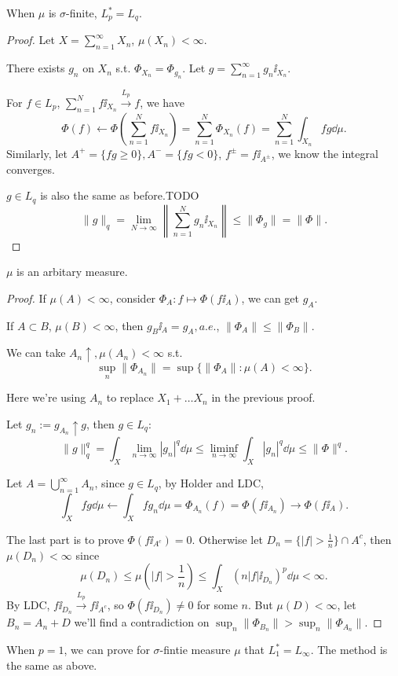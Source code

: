 \begin{proposition}
	When $\mu$ is $\sigma$-finite,  $L_p^* = L_q$.
\end{proposition}
\begin{proof}[Proof]
    Let $X = \sum_{n=1}^{\infty} X_n$, $\mu(X_n) < \infty$.

	There exists $g_n$ on $X_n$ s.t. $\Phi_{X_n} = \Phi_{g_n}$.
	Let $g = \sum_{n=1}^{\infty} g_n\ii_{X_n}$.

	For $f\in L_p$, $\sum_{n=1}^{N} f\ii_{X_n}\xrightarrow{L_p} f$, we have
	\[
	\Phi(f) \leftarrow \Phi\left(\sum_{n=1}^{N} f\ii_{X_n}\right)
	= \sum_{n=1}^{N} \Phi_{X_n}(f) = \sum_{n=1}^{N} \int_{X_n}fg\dd\mu.
	\]
	Similarly, let $A^+ = \{fg \ge 0\}, A^- = \{fg < 0\}$,
	$f^\pm = f\ii_{A^\pm}$, we know the integral converges.

	 $g\in L_q$ is also the same as before.TODO
	 \[
	 \lVert g \rVert _q =
	 \lim_{N\to \infty} \left\lVert \sum_{n=1}^{N} g_n\ii_{X_n} \right\rVert
	 \le \lVert \Phi_g \rVert = \lVert \Phi \rVert .
	 \]
\end{proof}

\begin{proposition}
	$\mu$ is an arbitary measure.
\end{proposition}
\begin{proof}[Proof]
    If $\mu(A) < \infty$, consider $\Phi_A: f\mapsto \Phi(f\ii_A)$,
	we can get $g_A$. 

	If $A \subset B$, $\mu(B) < \infty$, then $g_B\ii_A = g_A, a.e.$,
	$ \lVert \Phi_A \rVert \le \lVert \Phi_B \rVert$.

	We can take $A_n\uparrow, \mu(A_n) < \infty$ s.t.
	\[
	\sup_n \lVert \Phi_{A_n} \rVert = \sup\{\lVert \Phi_A \rVert : \mu(A) < \infty\}.
	\]
	\begin{remark}
	    Here we're using $A_n$ to replace $X_1 + \dots X_n$ in the previous proof.
	\end{remark}

	Let $g_n := g_{A_n} \uparrow g$, then $g\in L_q$:
	\[
	\lVert g \rVert _q^q = \int_X \lim_{n\to \infty} |g_n| ^q\dd\mu
	\le \liminf_{n\to \infty}\int_X |g_n| ^q\dd\mu \le \lVert \Phi \rVert ^q.
	\]

	Let $A = \bigcup_{n=1}^\infty A_n$,
	since $g\in L_q$, by Holder and LDC,
	\[
	\int_X fg\dd\mu \leftarrow \int_X fg_n\dd\mu = \Phi_{A_n}(f)
	= \Phi(f\ii_{A_n}) \to \Phi(f\ii_A).
	\]

	The last part is to prove $\Phi(f\ii_{A^c}) = 0$.
	Otherwise let $D_n = \{|f| > \frac{1}{n}\}\cap A^c$, then $\mu(D_n)<\infty$ since
	\[
	\mu(D_n) \le \mu\left(|f|>\frac{1}{n}\right)
	\le \int_X (n|f| \ii_{D_n})^p \dd\mu < \infty.
	\]
	By LDC, $f\ii_{D_n} \xrightarrow{L_p} f\ii_ {A^c}$, so $\Phi(f\ii_{D_n})\ne 0$
	for some $n$.
	But $\mu(D) < \infty$, let $B_n = A_n + D$ we'll find a contradiction
	on $\sup_n \lVert \Phi_{B_n} \rVert > \sup_n \lVert \Phi_{A_n} \rVert$.
\end{proof}

When $p = 1$, we can prove for $\sigma$-fintie measure $\mu$ that
$L_1^* = L_\infty$.
The method is the same as above.

